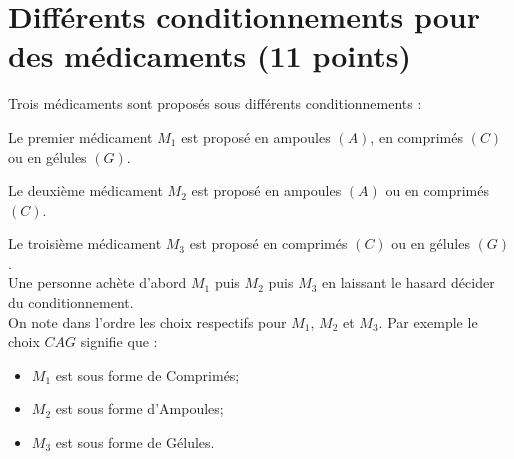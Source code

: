 \section{Différents conditionnements pour des médicaments (11 points)}

Trois médicaments sont proposés sous différents conditionnements :


Le premier médicament $M_1$ est proposé en ampoules $(A)$, en comprimés $(C)$ ou en gélules $(G)$.

Le deuxième médicament $M_2$ est proposé en ampoules $(A)$ ou en comprimés $(C)$.

Le troisième médicament $M_3$ est proposé en comprimés $(C)$ ou en gélules $(G)$.\\

Une personne achète d'abord $M_1$ puis $M_2$ puis $M_3$ en laissant le hasard décider du conditionnement.\\


On note dans l'ordre les choix respectifs pour $M_1$, $M_2$ et $M_3$.
Par exemple le choix $CAG$ signifie que :
\begin{itemize}
	\item $M_1$ est sous forme de Comprimés;
	\item $M_2$ est sous forme d'Ampoules;	
	\item $M_3$ est sous forme de Gélules.
\end{itemize}

